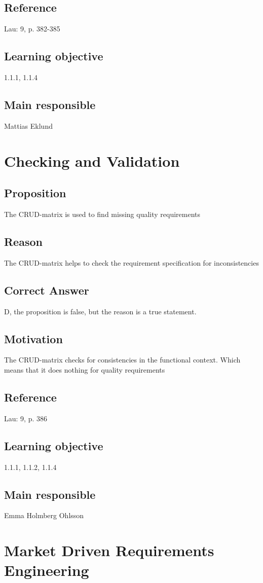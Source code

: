 \documentclass[a4paper]{article}
\begin{document}
\subsection*{Reference}
Lau: 9, p. 382-385
\subsection*{Learning objective}
1.1.1, 1.1.4
\subsection*{Main responsible}
Mattias Eklund

\section{Checking and Validation}
\subsection*{Proposition}
The CRUD-matrix is used to find missing quality requirements
\subsection*{Reason}
The CRUD-matrix helps to check the requirement specification for inconsistencies 
\subsection*{Correct Answer}
D, the proposition is false, but the reason is a true statement.
\subsection*{Motivation}
The CRUD-matrix checks for consistencies in the functional context. Which means that it does nothing for quality requirements
\subsection*{Reference}
Lau: 9, p. 386
\subsection*{Learning objective}
1.1.1, 1.1.2, 1.1.4
\subsection*{Main responsible}
Emma Holmberg Ohlsson

\section{Market Driven Requirements Engineering}
\end{document}
